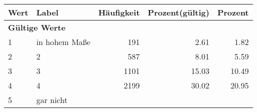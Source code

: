      \begin{longtable}{lXrrr}
     \toprule
     \textbf{Wert} & \textbf{Label} & \textbf{Häufigkeit} & \textbf{Prozent(gültig)} & \textbf{Prozent} \\
     \endhead
     \midrule
     \multicolumn{5}{l}{\textbf{Gültige Werte}}\\

     1 &
     \multicolumn{1}{X}{ in hohem Maße   } &


       \num{191} &
       \num[round-mode=places,round-precision=2]{2.61} &
         \num[round-mode=places,round-precision=2]{1.82} \\

     2 &
     \multicolumn{1}{X}{ 2   } &


       \num{587} &
       \num[round-mode=places,round-precision=2]{8.01} &
         \num[round-mode=places,round-precision=2]{5.59} \\

     3 &
     \multicolumn{1}{X}{ 3   } &


       \num{1101} &
       \num[round-mode=places,round-precision=2]{15.03} &
         \num[round-mode=places,round-precision=2]{10.49} \\

     4 &
     \multicolumn{1}{X}{ 4   } &


       \num{2199} &
       \num[round-mode=places,round-precision=2]{30.02} &
         \num[round-mode=places,round-precision=2]{20.95} \\

     5 &
     \multicolumn{1}{X}{ gar nicht   } &



\end{longtable}
